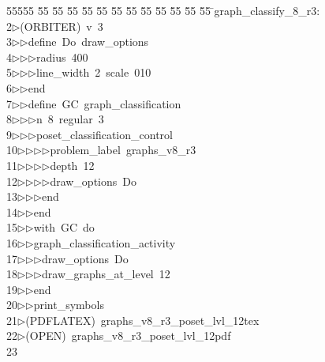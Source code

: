 %
%
\begin{tabbing}
55555 \= 55 \= 55 \= 55 \= 55 \= 55 \= 55 \= 55 \= 55 \= 55 \= 55 \= 55 \= 55 \= \>graph\_classify\_8\_r3:\\[0pt]
2\>$\triangleright$\>(ORBITER)\ v\ 3\ \\[0pt]
3\>$\triangleright$\>$\triangleright$\>define\ Do\ draw\_options\ \\[0pt]
4\>$\triangleright$\>$\triangleright$\>$\triangleright$\>radius\ 400\ \\[0pt]
5\>$\triangleright$\>$\triangleright$\>$\triangleright$\>line\_width\ 2\ scale\ 010\ \\[0pt]
6\>$\triangleright$\>$\triangleright$\>end\ \\[0pt]
7\>$\triangleright$\>$\triangleright$\>define\ GC\ graph\_classification\ \\[0pt]
8\>$\triangleright$\>$\triangleright$\>$\triangleright$\>n\ 8\ regular\ 3\ \\[0pt]
9\>$\triangleright$\>$\triangleright$\>$\triangleright$\>poset\_classification\_control\ \\[0pt]
10\>$\triangleright$\>$\triangleright$\>$\triangleright$\>$\triangleright$\>problem\_label\ graphs\_v8\_r3\ \\[0pt]
11\>$\triangleright$\>$\triangleright$\>$\triangleright$\>$\triangleright$\>depth\ 12\ \\[0pt]
12\>$\triangleright$\>$\triangleright$\>$\triangleright$\>$\triangleright$\>draw\_options\ Do\ \\[0pt]
13\>$\triangleright$\>$\triangleright$\>$\triangleright$\>end\ \\[0pt]
14\>$\triangleright$\>$\triangleright$\>end\ \\[0pt]
15\>$\triangleright$\>$\triangleright$\>with\ GC\ do\ \\[0pt]
16\>$\triangleright$\>$\triangleright$\>graph\_classification\_activity\ \\[0pt]
17\>$\triangleright$\>$\triangleright$\>$\triangleright$\>draw\_options\ Do\ \\[0pt]
18\>$\triangleright$\>$\triangleright$\>$\triangleright$\>draw\_graphs\_at\_level\ 12\ \\[0pt]
19\>$\triangleright$\>$\triangleright$\>end\ \\[0pt]
20\>$\triangleright$\>$\triangleright$\>print\_symbols\\[0pt]
21\>$\triangleright$\>(PDFLATEX)\ graphs\_v8\_r3\_poset\_lvl\_12tex\\[0pt]
22\>$\triangleright$\>(OPEN)\ graphs\_v8\_r3\_poset\_lvl\_12pdf\\[0pt]
23\>\end{tabbing}
